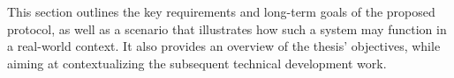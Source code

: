 This section outlines the key requirements and long-term goals of the proposed \pol{} protocol, as well as a scenario that illustrates how such a system may function in a real-world context. It also provides an overview of the thesis' objectives, while aiming at contextualizing the subsequent technical development work.
